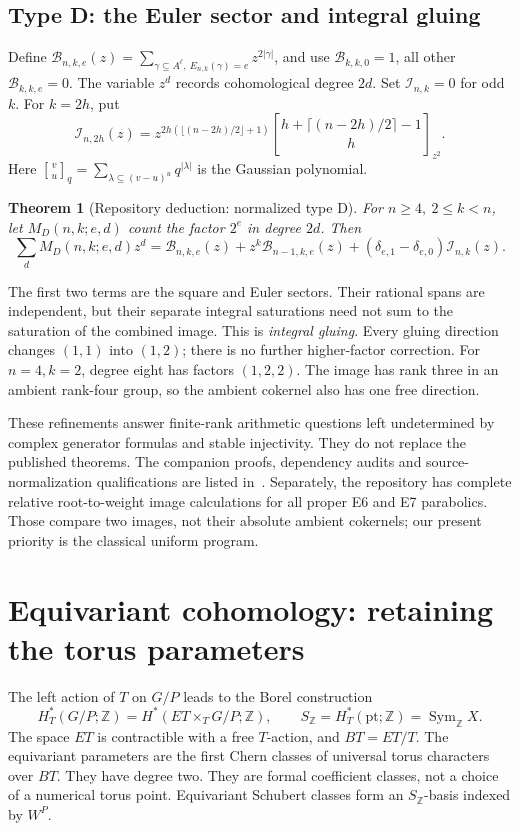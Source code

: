 \documentclass[11pt,letterpaper]{article}
\newcommand{\Z}{\mathbb Z}\newcommand{\Q}{\mathbb Q}\newcommand{\C}{\mathbb C}
\newcommand{\Sym}{\operatorname{Sym}}\newcommand{\Rep}{\operatorname{Rep}}
\newcommand{\qb}[3]{\genfrac{[}{]}{0pt}{}{#1}{#2}_{#3}}
\newtheorem{theorem}{Theorem}[section]
\theoremstyle{definition}\newtheorem{definition}[theorem]{Definition}
\begin{document}
\subsection{Type D: the Euler sector and integral gluing}
Define
\(\mathcal B_{n,k,e}(z)=
\sum_{\gamma\subseteq A^\ell,\ E_{n,k}(\gamma)=e}z^{2|\gamma|}\),
and use \(\mathcal B_{k,k,0}=1\), all other
\(\mathcal B_{k,k,e}=0\).
The variable \(z^d\) records cohomological degree \(2d\).
Set \(\mathcal I_{n,k}=0\) for odd \(k\). For \(k=2h\), put
\[
 \mathcal I_{n,2h}(z)=
 z^{2h(\lfloor(n-2h)/2\rfloor+1)}
 \qb{h+\lceil(n-2h)/2\rceil-1}{h}{z^2}.
 \tag{21}
\]
Here \(\qb{v}{u}{q}=\sum_{\lambda\subseteq(v-u)^u}q^{|\lambda|}\)
is the Gaussian polynomial.

\begin{theorem}[Repository deduction: normalized type D]
For \(n\ge4,\ 2\le k<n\), let \(M_D(n,k;e,d)\) count the factor
\(2^e\) in degree \(2d\). Then
\[
 \sum_dM_D(n,k;e,d)z^d
 =\mathcal B_{n,k,e}(z)+z^k\mathcal B_{n-1,k,e}(z)
   +(\delta_{e,1}-\delta_{e,0})\mathcal I_{n,k}(z).
 \tag{22}
\]
\end{theorem}
The first two terms are the square and Euler sectors. Their rational
spans are independent, but their separate integral saturations need
not sum to the saturation of the combined image. This is
\emph{integral gluing}. Every gluing direction changes
\((1,1)\) into \((1,2)\); there is no further higher-factor correction.
For \(n=4,k=2\), degree eight has factors \((1,2,2)\).
The image has rank three in an ambient rank-four group, so the
ambient cokernel also has one free direction.

These refinements answer finite-rank arithmetic questions left
undetermined by complex generator formulas and stable injectivity.
They do not replace the published theorems. The companion proofs,
dependency audits and source-normalization qualifications are
listed in~\cite{Companions}. Separately, the repository has complete
relative root-to-weight image calculations for all proper E6 and E7
parabolics. Those compare two images, not their absolute ambient
cokernels; our present priority is the classical uniform program.

\section{Equivariant cohomology: retaining the torus parameters}
The left action of \(T\) on \(G/P\) leads to the Borel construction
\[
 H_T^*(G/P;\Z)=H^*(ET\times_TG/P;\Z),\qquad
 S_\Z=H_T^*(\mathrm{pt};\Z)=\Sym_\Z X.
 \tag{23}
\]
The space \(ET\) is contractible with a free \(T\)-action, and \(BT=ET/T\).
The equivariant parameters are the first Chern classes of universal
torus characters over \(BT\). They have degree two. They are formal
coefficient classes, not a choice of a numerical torus point.
Equivariant Schubert classes form an \(S_\Z\)-basis indexed by \(W^P\).
\end{document}
